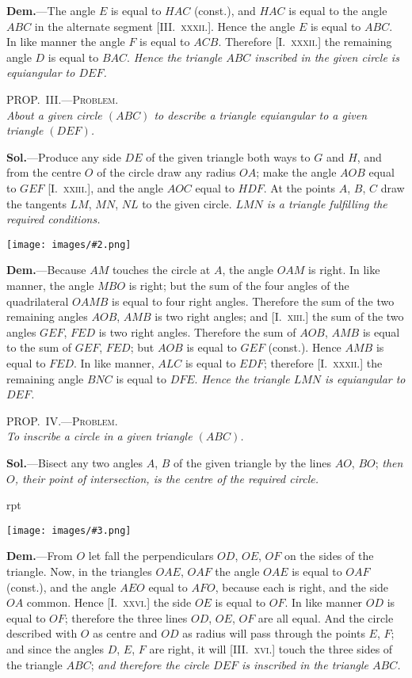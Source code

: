 \documentclass[oneside]{book}
\newcounter{wrapwidth}
\newcommand\myprop[2]{
\bigskip\Needspace*{4\baselineskip}\begin{center}\textsc{#1}\\\medskip\emph{#2}\par\end{center}
}
\newcommand\imgflow[3]{
\setcounter{wrapwidth}{#1}
\begin{wrapfigure}[#2]{r}{\value{wrapwidth}pt}
\begin{center}
\vspace{-0.3in}
\texttt{[image: images/\#3.png]}
\end{center}
\end{wrapfigure}
}
\newcommand\imgcent[2]{
\begin{center}
\texttt{[image: images/\#2.png]}
\end{center}
}
\begin{document}
\textbf{Dem.}---The angle $E$ is equal to $HAC$ (const.), and
$HAC$ is equal to the angle $ABC$ in the alternate segment
[III\@.~\textsc{xxxii.}]. Hence the angle $E$ is equal to
$ABC$. In like manner the angle $F$ is equal to $ACB$.
Therefore [I.~\textsc{xxxii.}] the remaining angle $D$ is equal to
$BAC$. \textit{Hence the triangle $ABC$ inscribed in the given
circle is equiangular to $DEF$.}

\myprop{PROP\@.~III\@.---Problem.}{About a given circle $(ABC)$ to describe a triangle equiangular
to a given triangle $(DEF)$.}

\textbf{Sol.}---Produce any side $DE$ of the given triangle
both ways to $G$ and $H$, and from the centre $O$ of the
circle draw any radius $OA$; make the angle $AOB$
equal to $GEF$ [I.~\textsc{xxiii.}], and the angle $AOC$ equal to
$HDF$. At the points $A$, $B$, $C$ draw the tangents $LM$,
$MN$, $NL$ to the given circle. \emph{$LMN$ is a triangle fulfilling
the required conditions.}

\imgcent{230}{f153}

\textbf{Dem.}---Because $AM$ touches the circle at $A$, the
angle $OAM$ is right. In like manner, the angle $MBO$
is right; but the sum of the four angles of the quadrilateral
$OAMB$ is equal to four right angles. Therefore
the sum of the two remaining angles $AOB$, $AMB$
is two right angles; and [I.~\textsc{xiii.}] the sum of the two
angles $GEF$, $FED$ is two right angles. Therefore the
sum of $AOB$, $AMB$ is equal to the sum of $GEF$, $FED$;
but $AOB$ is equal to $GEF$ (const.). Hence $AMB$ is
equal to $FED$. In like manner, $ALC$ is equal to
$EDF$; therefore [I.~\textsc{xxxii.}] the remaining angle $BNC$
is equal to $DFE$. \textit{Hence the triangle $LMN$ is equiangular
to $DEF$.}

\myprop{PROP\@.~IV\@.---Problem.}{To inscribe a circle in a given triangle $(ABC)$.}

\textbf{Sol.}---Bisect any two angles $A$, $B$ of the given triangle
by the lines $AO$, $BO$; \emph{then $O$, their point of
intersection, is the centre of the required circle.}

\imgflow{120}{11}{f154}

\textbf{Dem.}---From $O$ let fall the perpendiculars $OD$, $OE$,
$OF$ on the sides of the triangle. %
Now, in the triangles $OAE$,
$OAF$ the angle $OAE$ is equal to
$OAF$ (const.), and the angle
$AEO$ equal to $AFO$, because
each is right, and the side $OA$
common. Hence [I.~\textsc{xxvi.}] the
side $OE$ is equal to $OF$. In
like manner $OD$ is equal to $OF$;
therefore the three lines $OD$,
$OE$, $OF$ are all equal. And the
circle described with $O$ as centre and $OD$ as radius will
pass through the points $E$, $F$; and since the angles
$D$, $E$, $F$ are right, it will [III\@.~\textsc{xvi.}] touch the three
sides of the triangle $ABC$; \textit{and therefore the circle $DEF$
is inscribed in the triangle $ABC$.}
\end{document}
